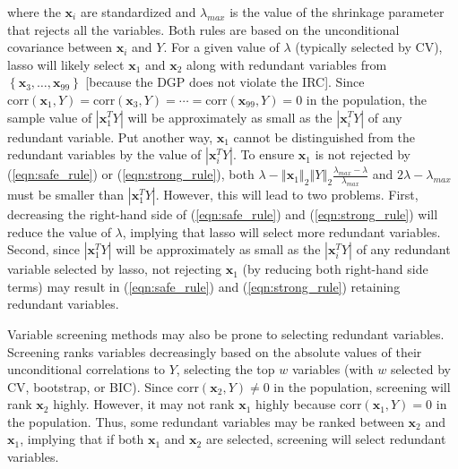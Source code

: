 \documentclass[11pt,review,authoryear]{elsarticle}
\begin{document}
where the $\mathbf{x}_i$ are standardized and $\lambda_{max}$ is the value of the shrinkage parameter that rejects all the variables. Both rules are based on the unconditional covariance between $\mathbf{x}_i$ and $Y$. For a given value of $\lambda$ (typically selected by CV), lasso will likely select $\mathbf{x}_1$ and $\mathbf{x}_2$ along with redundant variables from $\left\{ \mathbf{x}_3, \ldots, \mathbf{x}_{99} \right\}$ [because the DGP does not violate the IRC]. Since $\mathrm{corr} \left( \mathbf{x}_1, Y \right) = \mathrm{corr} \left( \mathbf{x}_3, Y \right) =  \cdots = \mathrm{corr} \left( \mathbf{x}_{99}, Y \right) = 0$ in the population, the sample value of $\left\vert \mathbf{x}_1^T Y \right\vert$ will be approximately as small as the $\left\vert \mathbf{x}_i^T Y \right\vert$ of any redundant variable. Put another way, $\mathbf{x}_1$ cannot be distinguished from the redundant variables by the value of $\left\vert \mathbf{x}_i^T Y \right\vert$. To ensure $\mathbf{x}_1$ is not rejected by (\ref{eqn:safe_rule}) or (\ref{eqn:strong_rule}), both $\lambda - \left\Vert \mathbf{x}_1 \right\Vert_2 \left\Vert Y \right\Vert_2 \frac{\lambda_{max} - \lambda} {\lambda_{max}}$ and $2\lambda - \lambda_{max}$ must be smaller than $\left\vert \mathbf{x}_1^T Y \right\vert$. However, this will lead to two problems. First, decreasing the right-hand side of (\ref{eqn:safe_rule}) and (\ref{eqn:strong_rule}) will reduce the value of $\lambda$, implying that lasso will select more redundant variables. Second, since $\left\vert \mathbf{x}_1^T Y \right\vert$ will be approximately as small as the $\left\vert \mathbf{x}_i^T Y \right\vert$ of any redundant variable selected by lasso, not rejecting $\mathbf{x}_1$ (by reducing both right-hand side terms) may result in (\ref{eqn:safe_rule}) and (\ref{eqn:strong_rule}) retaining redundant variables.

Variable screening methods \citep{fan2008sure} may also be prone to selecting redundant variables. Screening ranks variables decreasingly based on the absolute values of their unconditional correlations to $Y$, selecting the top $w$ variables (with $w$ selected by CV, bootstrap, or BIC). Since $\mathrm{corr} \left( \mathbf{x}_2, Y \right) \neq 0$ in the population, screening will rank $\mathbf{x}_2$ highly. However, it may not rank $\mathbf{x}_1$ highly because $\mathrm{corr} \left( \mathbf{x}_1, Y \right) = 0$ in the population. Thus, some redundant variables may be ranked between $\mathbf{x}_2$ and $\mathbf{x}_1$, implying that if both $\mathbf{x}_1$ and $\mathbf{x}_2$ are selected, screening will select redundant variables.
\end{document}
